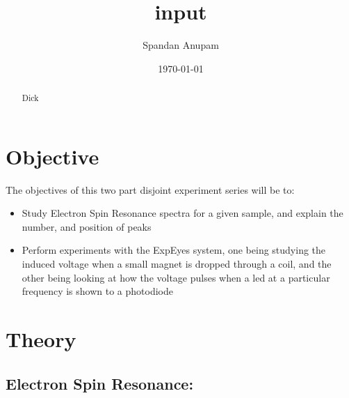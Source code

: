 \documentclass{ieeeconf}
\begin{document}
\title{input}

\author{Spandan Anupam}

\date{\today}
\maketitle

\begin{abstract}
Dick

\end{abstract}
\section{Objective}
The objectives of this two part disjoint experiment series will be to:

\begin{itemize}
\tightlist
\item
Study Electron Spin Resonance spectra for a given sample, and explain the number, and position of peaks
\item
Perform experiments with the ExpEyes system, one being studying the induced voltage when a small magnet is dropped through a coil, and the other being looking at how the voltage pulses when a led at a particular frequency is shown to a photodiode
\end{itemize}
\section{Theory}
\subsection{Electron Spin Resonance:}
\end{document}
